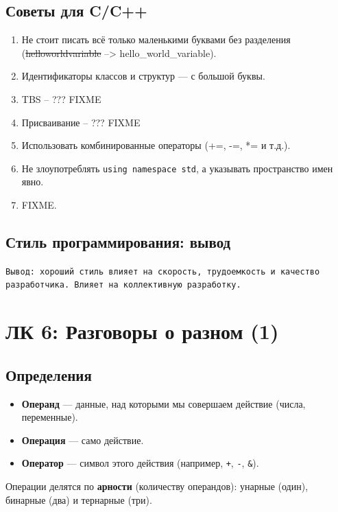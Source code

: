 \documentclass[a4paper, 12pt]{article}
\newcommand{\term}[1]{\textbf{#1}} %
\newcommand{\code}[1]{\texttt{#1}} %
\begin{document}
\subsection*{Советы для C/C++}

\begin{enumerate}
    \item Не стоит писать всё только маленькими буквами без разделения (\sout{helloworldvariable} --> hello\_world\_variable).
    \item Идентификаторы классов и структур --- с большой буквы.
    \item TBS -- ??? FIXME
    \item Присваивание -- ??? FIXME
    \item Использовать комбинированные операторы (+=, -=, *= и т.д.).
    \item Не злоупотреблять \code{using namespace std}, а указывать пространство имен явно.
    \item FIXME.
\end{enumerate}

\subsection*{Стиль программирования: вывод}
\texttt{Вывод: хороший стиль влияет на скорость, трудоемкость и качество разработчика. Влияет на коллективную разработку.}

\newpage

\section{ЛК 6: Разговоры о разном (1)}
\label{sec:l6}

\subsection*{Определения}
\begin{itemize}
    \item \term{Операнд} --- данные, над которыми мы совершаем действие (числа, переменные).
    \item \term{Операция} --- само действие.
    \item \term{Оператор} --- символ этого действия (например, \code{+}, \code{-}, \code{\&}).
\end{itemize}

Операции делятся по \term{арности} (количеству операндов): унарные (один), бинарные (два) и тернарные (три).
\end{document}
